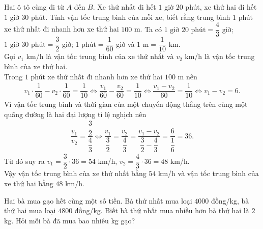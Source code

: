 \begin{vn}
	Hai ô tô cùng đi từ $A$ đến $B$. Xe thứ nhất đi hết $1$ giờ $20$ phút, xe thứ hai đi hết $1$ giờ $30$ phút. Tính vận tốc trung bình của mỗi xe, biết rằng trung bình $1$ phút xe thứ nhất đi nhanh hơn xe thứ hai $100$ m.
	\loigiai
	{
		Ta có $1 \text{ giờ } 20 \text{ phút} = \dfrac{4}{3}$ giờ; $1 \text{ giờ } 30 \text{ phút} = \dfrac{3}{2}$ giờ; $1 \text{ phút} =\dfrac{1}{60}$ giờ và $1 \text{ m}=\dfrac{1}{10}$ km.\\
		Gọi $v_1$ km/h là vận tốc trung bình của xe thứ nhất và $v_2$ km/h là vận tốc trung bình của xe thứ hai.\\
		Trong  $1$ phút xe thứ nhất đi nhanh hơn xe thứ hai $100$ m nên
		\begin{eqnarray*}
			v_1 \cdot \dfrac{1}{60} - v_2 \cdot \dfrac{1}{60} = \dfrac{1}{10} \Leftrightarrow \dfrac{v_1}{60} - \dfrac{v_2}{60} = \dfrac{1}{10} \Leftrightarrow \dfrac{v_1-v_2}{60} = \dfrac{1}{10} \Leftrightarrow v_1-v_2=6.
		\end{eqnarray*}
		Vì vận tốc trung bình và thời gian của một chuyển động thẳng trên cùng một quãng đường là hai đại lượng tỉ lệ nghịch nên
		\begin{eqnarray*}
			\dfrac{v_1}{v_2} = \dfrac{\dfrac{3}{2}}{\dfrac{4}{3}} \Leftrightarrow \dfrac{v_1}{\dfrac{3}{2}} = \dfrac{v_2}{\dfrac{4}{3}} = \dfrac{v_1-v_2}{\dfrac{3}{2} - \dfrac{4}{3}} = \dfrac{6}{\dfrac{1}{6}} = 36.
		\end{eqnarray*}
		Từ đó suy ra $v_1=\dfrac{3}{2} \cdot 36 = 54$ km/h, $v_2=\dfrac{4}{3} \cdot 36=48$ km/h.\\
		Vậy vận tốc trung bình của xe thứ nhất bằng $54$ km/h và vận tốc trung bình của xe thứ hai bằng $48$ km/h.
	}
\end{vn}
\begin{vn}
Hai bà mua gạo hết cùng một số tiền. Bà thứ nhất mua loại $ 4000 $ đồng/kg, bà thứ hai mua loại $ 4800 $ đồng/kg. Biết bà thứ nhất mua nhiều hơn bà thứ hai là $ 2 $ kg. Hỏi mỗi bà đã mua bao nhiêu kg gạo?
\end{vn}
